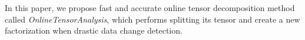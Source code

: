 
In this paper, we propose fast and accurate online tensor decomposition method called {\em OnlineTensorAnalysis}, which performs splitting its tensor and create a new factorization when drastic data change detection.
